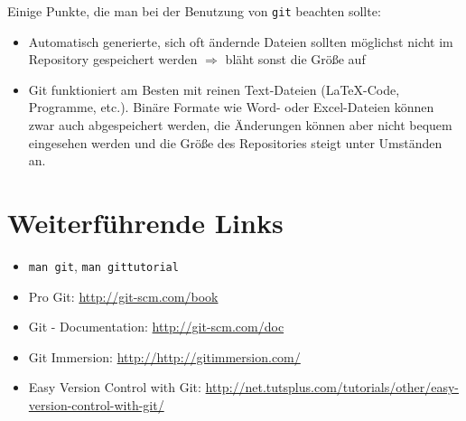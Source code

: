 Einige Punkte, die man bei der Benutzung von \texttt{git} beachten sollte:
\begin{itemize}
  \item Automatisch generierte, sich oft ändernde Dateien sollten möglichst nicht im Repository gespeichert werden
    $\Rightarrow$ bläht sonst die Größe auf
  \item Git funktioniert am Besten mit reinen Text-Dateien (\LaTeX-Code, Programme, etc.).
    Binäre Formate wie Word- oder Excel-Dateien können zwar auch abgespeichert werden, die Änderungen können aber nicht bequem eingesehen werden und die Größe des Repositories steigt unter Umständen an.
\end{itemize}

\section{Weiterführende Links}
\begin{itemize}
  \item \texttt{man git}, \texttt{man gittutorial}
  \item Pro Git: \url{http://git-scm.com/book}
  \item Git - Documentation: \url{http://git-scm.com/doc}
  \item Git Immersion: \url{http://http://gitimmersion.com/}
  \item Easy Version Control with Git: \url{http://net.tutsplus.com/tutorials/other/easy-version-control-with-git/}
\end{itemize}
